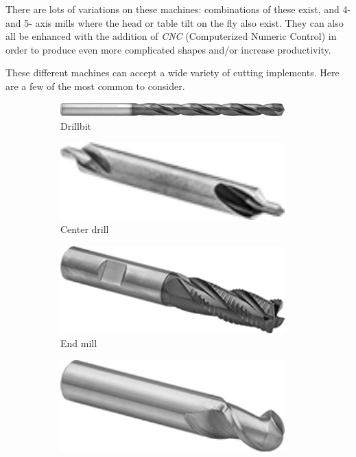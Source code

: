 \documentclass[10pt,letterpaper]{book}
\begin{document}
  There are lots of variations on these machines: combinations of these exist, and 4- and 5- axis mills where the head or table tilt on the fly also exist. They can also all be enhanced with the addition of \textit{CNC} (Computerized Numeric Control) in order to produce even more complicated shapes and/or increase productivity.
  
 These different machines can accept a wide variety of cutting implements. Here are a few of the most common to consider.
 
 \begin{figure}[H]
	\centering
	\begin{subfigure}[b]{.19\linewidth}
		\includegraphics[width=0.95\textwidth]{imgs/drillbit.png}
		\caption{Drillbit}
	\end{subfigure} \begin{subfigure}[b]{.19\linewidth}
		\includegraphics[width=0.95\textwidth]{imgs/centerdrill.png}
		\caption{Center drill}
	\end{subfigure}	\begin{subfigure}[b]{.19\linewidth}
		\includegraphics[width=0.95\textwidth]{imgs/endmill.png}
		\caption{End mill}
	\end{subfigure}	\begin{subfigure}[b]{.19\linewidth}
		\includegraphics[width=0.95\textwidth]{imgs/ball_endmill.png}

\end{subfigure}
\end{figure}
\end{document}
